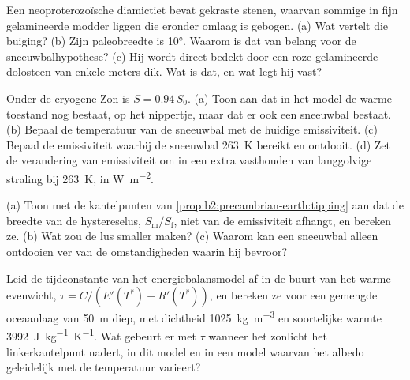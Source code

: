 \begin{exercise}[$\star\star$]\label{exo:b2:precambrian-earth:9}
Een neoproterozoïsche diamictiet bevat gekraste stenen, waarvan sommige in fijn gelamineerde modder liggen
die eronder omlaag is gebogen. (a) Wat vertelt die buiging? (b) Zijn paleobreedte is
\ang{10}. Waarom is dat van belang voor de sneeuwbalhypothese? (c) Hij wordt direct bedekt door een
roze gelamineerde dolosteen van enkele meters dik. Wat is dat, en wat legt hij vast?
\end{exercise}

\begin{exercise}[$\star\star\star$]\label{exo:b2:precambrian-earth:10}
Onder de cryogene Zon is $S = 0.94\,S_0$. (a) Toon aan dat in het model de warme toestand nog
bestaat, op het nippertje, maar dat er ook een sneeuwbal bestaat. (b) Bepaal de temperatuur van de sneeuwbal met
de huidige emissiviteit. (c) Bepaal de emissiviteit waarbij de sneeuwbal \qty{263}{K} bereikt en
ontdooit. (d) Zet de verandering van emissiviteit om in een extra vasthouden van langgolvige straling bij
\qty{263}{K}, in \unit{W.m^{-2}}.
\end{exercise}

\begin{exercise}[$\star\star\star$]\label{exo:b2:precambrian-earth:11}
(a) Toon met de kantelpunten van \cref{prop:b2:precambrian-earth:tipping} aan dat de breedte
van de hystereselus, $S_{\text{m}}/S_{\text{f}}$, niet van de emissiviteit afhangt, en
bereken ze. (b) Wat zou de lus smaller maken? (c) Waarom kan een sneeuwbal alleen ontdooien ver van
de omstandigheden waarin hij bevroor?
\end{exercise}

\begin{exercise}[$\star\star\star$]\label{exo:b2:precambrian-earth:12}
Leid de tijdconstante van het energiebalansmodel af in de buurt van het warme evenwicht, $\tau =
C/(E'(T^*) - R'(T^*))$, en bereken ze voor een gemengde oceaanlaag van \qty{50}{m} diep, met dichtheid
\qty{1025}{kg.m^{-3}} en soortelijke warmte \qty{3992}{J.kg^{-1}.K^{-1}}. Wat gebeurt er met $\tau$ wanneer het
zonlicht het linkerkantelpunt nadert, in dit model en in een model waarvan het albedo
geleidelijk met de temperatuur varieert?
\end{exercise}

